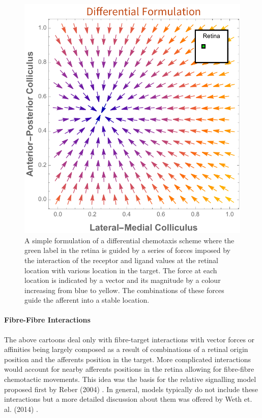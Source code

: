 \begin{figure}[h!]
	\centering
	\includegraphics[width=\textwidth]{images/introduction/differential_chemotaxis_type2}
	\def\c{A simple formulation of a differential chemotaxis scheme where the green label in the retina is guided by a series of forces imposed by the interaction of the receptor and ligand values at the retinal location with various location in the target. }
	\caption[\c]{A simple formulation of a differential chemotaxis scheme where the green label in the retina is guided by a series of forces imposed by the interaction of the receptor and ligand values at the retinal location with various location in the target. The force at each location is indicated by a vector and its magnitude by a colour increasing from blue to yellow. The combinations of these forces guide the afferent into a stable location. \label{fig:diffchemotaxistype2}} 
\end{figure}

\paragraph{Fibre-Fibre Interactions}
The above cartoons deal only with fibre-target interactions with vector forces or affinities being largely composed as a result of combinations of a retinal origin position and the afferents position in the target. More complicated interactions would account for nearby afferents positions in the retina allowing for fibre-fibre chemotactic movements. This idea was the basis for the relative signalling model proposed first by Reber (2004) \cite{Reber2004-wq}. In general, models typically do not include these interactions but a more detailed discussion about them was offered by Weth et. al. (2014) \cite{Weth2014-dq}. 
